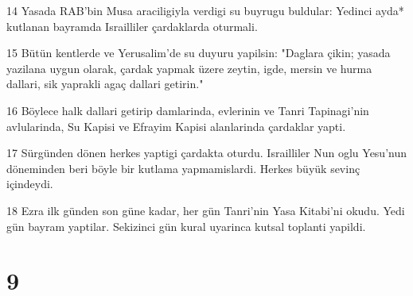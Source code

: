 \par 14 Yasada RAB'bin Musa araciligiyla verdigi su buyrugu buldular: Yedinci ayda* kutlanan bayramda Israilliler çardaklarda oturmali.
\par 15 Bütün kentlerde ve Yerusalim'de su duyuru yapilsin: "Daglara çikin; yasada yazilana uygun olarak, çardak yapmak üzere zeytin, igde, mersin ve hurma dallari, sik yaprakli agaç dallari getirin."
\par 16 Böylece halk dallari getirip damlarinda, evlerinin ve Tanri Tapinagi'nin avlularinda, Su Kapisi ve Efrayim Kapisi alanlarinda çardaklar yapti.
\par 17 Sürgünden dönen herkes yaptigi çardakta oturdu. Israilliler Nun oglu Yesu'nun döneminden beri böyle bir kutlama yapmamislardi. Herkes büyük sevinç içindeydi.
\par 18 Ezra ilk günden son güne kadar, her gün Tanri'nin Yasa Kitabi'ni okudu. Yedi gün bayram yaptilar. Sekizinci gün kural uyarinca kutsal toplanti yapildi.

\chapter{9}

